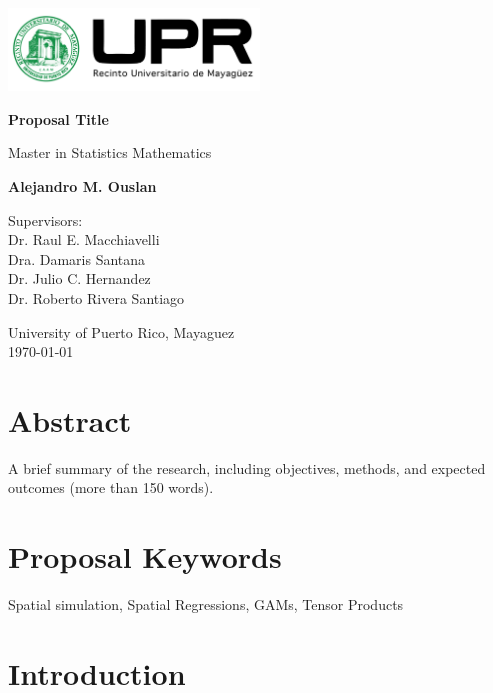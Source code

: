 \documentclass{article}
\begin{document}
\begin{titlepage}
	\centering
	\vspace*{1cm}

	\includegraphics[width=0.5\textwidth]{assets/logo.png}\par\vspace{1cm} %

	\Huge
	\textbf{Proposal Title}

	\vspace{0.5cm}
	\LARGE
	Master in Statistics Mathematics

	\vspace{1.5cm}


	\textbf{Alejandro M. Ouslan}

	\vfill

	\Large
	Supervisors: \\
	Dr. Raul E. Macchiavelli \\
	Dra. Damaris Santana \\
	Dr. Julio C. Hernandez \\
	Dr. Roberto Rivera Santiago

	\vspace{0.8cm}

	\Large
	University of Puerto Rico, Mayaguez \\
	{\small \today}

\end{titlepage}


\newpage

\section{Abstract}
A brief summary of the research, including objectives, methods, and expected outcomes (more than 150 words).

\section{Proposal Keywords}
Spatial simulation, Spatial Regressions, GAMs, Tensor Products

\section{Introduction}
\end{document}
